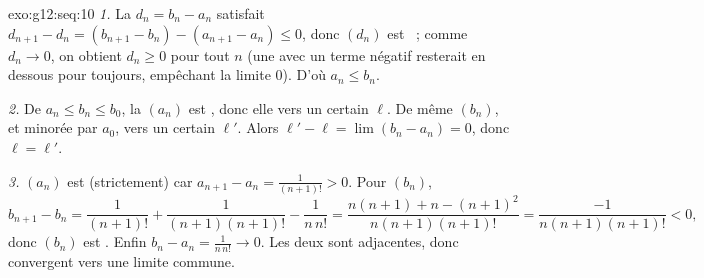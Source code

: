 \begin{solution}{exo:g12:seq:10}
\emph{1.} La  $d_n = b_n - a_n$ satisfait
$d_{n+1} - d_n = (b_{n+1} - b_n) - (a_{n+1} - a_n) \leq 0$, donc $(d_n)$
est ~; comme $d_n \to 0$, on obtient $d_n \geq 0$ pour tout
$n$ (une   avec un terme négatif resterait en dessous
pour toujours, empêchant la limite $0$). D'où $a_n \leq b_n$.

\emph{2.} De $a_n \leq b_n \leq b_0$, la   $(a_n)$ est
, donc elle  vers un certain $\ell$. De même $(b_n)$,
 et minorée par $a_0$,  vers un certain $\ell'$.
Alors $\ell' - \ell = \lim (b_n - a_n) = 0$, donc $\ell = \ell'$.

\emph{3.} $(a_n)$ est (strictement)  car
$a_{n+1} - a_n = \frac{1}{(n+1)!} > 0$. Pour $(b_n)$,
\[
b_{n+1} - b_n = \frac{1}{(n+1)!} + \frac{1}{(n+1)(n+1)!} - \frac{1}{n\,n!}
= \frac{n(n+1) + n - (n+1)^2}{n(n+1)(n+1)!}
= \frac{-1}{n(n+1)(n+1)!} < 0 ,
\]
donc $(b_n)$ est . Enfin $b_n - a_n = \frac{1}{n\,n!} \to 0$.
Les deux  sont adjacentes, donc convergent vers une limite
commune.
\end{solution}

